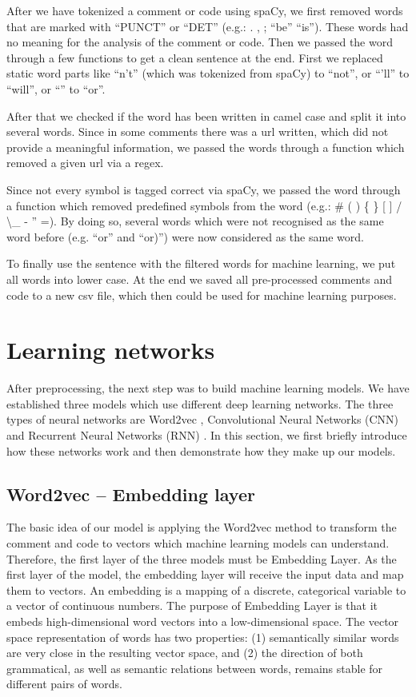 \documentclass[runningheads]{llncs}
\begin{document}
After we have tokenized a comment or code using spaCy, we first removed words that are marked with ``PUNCT'' or ``DET'' (e.g.: . , ; ``be'' ``is''). These words had no meaning for the analysis of the comment or code.
Then we passed the word through a few functions to get a clean sentence at the end. First we replaced static word parts like ``n't'' (which was tokenized from spaCy) to ``not'', or ``'ll'' to ``will'', or ``\textbar\textbar'' to ``or''.

After that we checked if the word has been written in camel case and split it into several words. Since in some comments there was a url written, which did not provide a meaningful information, we passed the words through a function
which removed a given url via a regex.

Since not every symbol is tagged correct via spaCy, we passed the word through a function which removed predefined symbols from the word (e.g.: \# ( ) \{ \} [ ] / \textbackslash \_ - '' =).
By doing so, several words which were not recognised as the same word before (e.g. ``or'' and ``or)'') were now considered as the same word.

To finally use the sentence with the filtered words for machine learning, we put all words into lower case.
At the end we saved all pre-processed comments and code to a new csv file, which then could be used for machine learning purposes.


\section{Learning networks}\label{chapter:learning}
After preprocessing, the next step was to build machine learning models. We have established three models which use different deep learning networks. The three types of neural networks are Word2vec \cite{ref_mikolov}, Convolutional Neural Networks (CNN) \cite{ref_yoon} and Recurrent Neural Networks (RNN) \cite{ref_rnn}. In this section, we first briefly introduce how these networks work and then demonstrate how they make up our models.

\subsection{Word2vec -- Embedding layer}
The basic idea of our model is applying the Word2vec method to transform the comment and code to vectors which machine learning models can understand. Therefore, the first layer of the three models must be Embedding Layer. As the first layer of the model, the embedding layer will receive the input data and map them to vectors. An embedding is a mapping of a discrete, categorical variable to a vector of continuous numbers. The purpose of Embedding Layer is that it embeds high-dimensional word vectors into a low-dimensional space. The vector space representation of words has two properties: (1) semantically similar words are very close in the resulting vector space, and (2) the direction of both grammatical, as well as semantic relations between words, remains stable for different pairs of words. 
\end{document}
